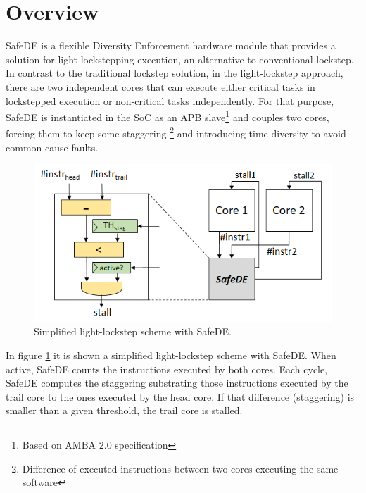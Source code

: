 \newpage
\section{Overview}
\label{chapter1}


SafeDE is a flexible Diversity Enforcement hardware module that provides a solution for light-lockstepping execution, an alternative to conventional lockstep. In contrast to the traditional lockstep solution, in the light-lockstep approach, there are two independent cores that can execute either critical tasks in lockstepped execution or non-critical tasks independently. For that purpose, SafeDE is instantiated in the SoC as an APB slave\footnote{Based on AMBA 2.0 specification} and couples two cores, forcing them to keep some staggering \footnote{Difference of executed instructions between two cores executing the same software} and introducing time diversity to avoid common cause faults.

\begin{figure}[H]
	\includegraphics[keepaspectratio,width=\columnwidth]{img/safede}
        \caption{Simplified light-lockstep scheme with SafeDE.}
	\label{fig:simplified_scheme}
\end{figure}
In figure \ref{fig:simplified_scheme} it is shown a simplified light-lockstep scheme with SafeDE. When active, SafeDE counts the instructions executed by both cores. Each cycle, SafeDE computes the staggering substrating those instructions executed by the trail core to the ones executed by the head core. If that difference (staggering) is smaller than a given threshold, the trail core is stalled.

